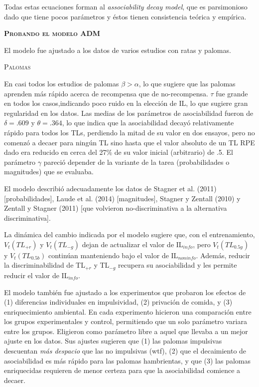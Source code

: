 \documentclass[a4paper,12pt]{article}
\begin{document}
Todas estas ecuaciones forman al {\itshape associability decay model}, que es parsimonioso dado que tiene pocos parámetros y éstos tienen consistencia teórica y empírica.

{\scshape\bfseries Probando el modelo ADM}

El modelo fue ajustado a los datos de varios estudios con ratas y palomas.

{\scshape Palomas}

En casi todos los estudios de palomas $\beta > \alpha$, lo que sugiere que las palomas aprenden más rápido acerca de recompensa que de no-recompensa. $\tau$ fue grande en todos los casos,indicando poco ruido en la elección de IL, lo que sugiere gran regularidad en los datos. Las medias de los parámetros de asociabilidad fueron de $\delta = {.}609$ y $\theta = {.}364$, lo que indica que la asociabilidad decayó relativamente rápido para todos los TLs, perdiendo la mitad de su valor en dos ensayos, pero no comenzó a decaer para ningún TL sino hasta que el valor absoluto de un TL RPE dado era reducido en cerca del 27\% de su valor inicial (arbitrario) de .5. El parámetro $\gamma$ pareció depender de la variante de la tarea (probabilidades o magnitudes) que se evaluaba.

El modelo describió adecuadamente los datos de Stagner et al. (2011) [probabilidades], Laude et al. (2014) [magnitudes], Stagner y Zentall (2010) y Zentall y Stagner (2011) [que volvieron no-discriminativa a la alternativa discriminativa].

La dinámica del cambio indicada por el modelo sugiere que, con el entrenamiento, $V_t(TL_{+r})$ y $V_t(TL_{-g})$ dejan de actualizar el valor de IL$_{info}$, pero $V_t(TL_{0{.}5y})$ y $V_t(TL_{0{.}5b})$ continúan manteniendo bajo el valor de IL$_{noninfo}$. Además, reducir la discriminabilidad de TL$_{+r}$ y TL$_{-g}$ recupera su asociabilidad y les permite reducir el valor de IL$_{info}$.

El modelo también fue ajustado a los experimentos que probaron los efectos de (1) diferencias individuales en impulsividad, (2) privación de comida, y (3) enriquecimiento ambiental. En cada experimento hicieron una comparación entre los grupos experimentales y control, permitiendo que un solo parámetro variara entre los grupos. Eligieron como parámetro libre a aquel que llevaba a un mejor ajuste en los datos. Sus ajustes sugieren que (1) las palomas impulsivas descuentan {\slshape más despacio} que las no impulsivas (wtf), (2) que el decaimiento de asociabilidad es más rápido para las palomas hambrientas, y que (3) las palomas enriquecidas requieren de menor certeza para que la asociabilidad comience a decaer.
\end{document}
